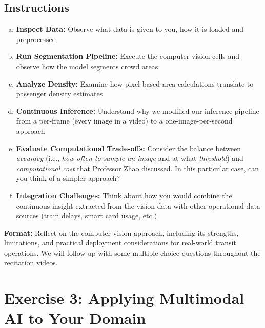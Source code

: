 \documentclass[11pt]{article}
\begin{document}
\subsection*{Instructions}
\begin{enumerate}[(a)]
\item \textbf{Inspect Data:} Observe what data is given to you, how it is loaded and preprocessed
\item \textbf{Run Segmentation Pipeline:} Execute the computer vision cells and observe how the model segments crowd areas
\item \textbf{Analyze Density:} Examine how pixel-based area calculations translate to passenger density estimates
\item \textbf{Continuous Inference:} Understand why we modified our inference pipeline from a per-frame (every image in a video) to a one-image-per-second approach
\item \textbf{Evaluate Computational Trade-offs:} Consider the balance between \textit{accuracy} (i.e., \textit{how often to sample an image} and at what \textit{threshold}) and \textit{computational cost} that Professor Zhao discussed. In this particular case, can you think of a simpler approach?
\item \textbf{Integration Challenges:} Think about how you would combine the continuous insight extracted from the vision data with other operational data sources (train delays, smart card usage, etc.)
\end{enumerate}

\noindent\textbf{Format:} Reflect on the computer vision approach, including its strengths, limitations, and practical deployment considerations for real-world transit operations. We will follow up with some multiple-choice questions throughout the recitation videos.

\section*{Exercise 3: Applying Multimodal AI to Your Domain}

\begin{center}
\end{center}
\end{document}
